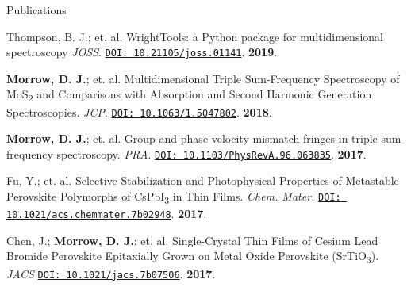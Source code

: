 \documentclass{resume} %
\begin{document}
\begin{rSection}{Publications}
\begin{etaremune}[topsep=0pt,itemsep=0pt,partopsep=0pt,parsep=0pt]
\item Thompson, B. J.; et. al. %
WrightTools: a Python package for multidimensional spectroscopy \emph{JOSS}. 
\href{http://doi.org/10.21105/joss.01141}{\texttt{DOI: 10.21105/joss.01141}}. \textbf{2019}.
	
\item \textbf{Morrow, D. J.}; et. al. %
Multidimensional Triple Sum-Frequency Spectroscopy of MoS\textsubscript{2} and Comparisons with Absorption and Second Harmonic Generation Spectroscopies. \emph{JCP}. \href{http://doi.org/10.1063/1.5047802}{\texttt{DOI: 10.1063/1.5047802}}. \textbf{2018}.
	
\item \textbf{Morrow, D. J.}; et. al. %
Group and phase velocity mismatch fringes in triple sum-frequency spectroscopy. \emph{PRA}. \href{https://journals.aps.org/pra/abstract/10.1103/PhysRevA.96.063835}{\texttt{DOI: 10.1103/PhysRevA.96.063835}}. \textbf{2017}.

\item Fu, Y.;  et. al. %
Selective Stabilization and Photophysical Properties of Metastable Perovskite Polymorphs of CsPbI\textsubscript{3} in Thin Films. \emph{Chem. Mater.} \href{http://pubs.acs.org/doi/10.1021/acs.chemmater.7b02948}{\texttt{DOI: 10.1021/acs.chemmater.7b02948}}. \textbf{2017}. 
 
\item Chen, J.; \textbf{Morrow, D. J.}; et. al. %
Single-Crystal Thin Films of Cesium Lead Bromide Perovskite Epitaxially Grown on Metal Oxide Perovskite (SrTiO\textsubscript{3}). \emph{JACS} \href{http://pubs.acs.org/doi/10.1021/jacs.7b07506}{\texttt{DOI: 10.1021/jacs.7b07506}}. \textbf{2017}. 
	



\end{etaremune}

\end{rSection}
\end{document}
